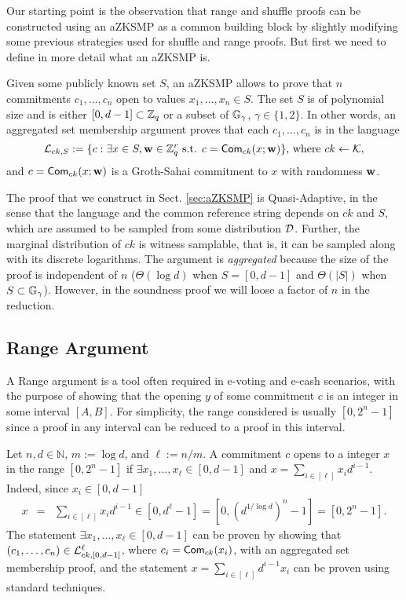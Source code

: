 Our starting point is the observation that range and shuffle proofs can be constructed using an aZKSMP as a common building block by slightly modifying some previous strategies used for shuffle and range proofs. But first we need to define in more detail what an aZKSMP is.

Given some publicly known set $S$, an aZKSMP allows to prove that $n$ commitments $c_1,\ldots,c_n$ open to values $x_1,\ldots,x_n \in S$.  The set $S$ is of polynomial size and is either $[0,d-1]\subset\mathbb{Z}_q$ or a subset of $\mathbb{G}_\gamma$, $\gamma \in \{1,2\}$.  
In other words, an aggregated set membership argument proves that each $c_1,\ldots,c_n$ is in the language
$$
\mathcal{L}_{ck,S}:=\{c: \exists x\in S, \mathbf{w}\in\mathbb{Z}_q^r \text{ s.t. } c=\mathsf{Com}_{ck}(x;\mathbf{w})\}\text{, where }ck\gets\mathcal{K},
$$
and $c=\mathsf{Com}_{ck}(x;\mathbf{w})$ is a Groth-Sahai commitment to $x$ with randomness $\mathbf{w}$.

The proof that we construct in Sect. \ref{sec:aZKSMP} is Quasi-Adaptive, in the sense that the language and the common reference string depends on $ck$ and $S$, which are assumed to be sampled from some distribution $\mathcal{D}$. Further, the marginal distribution of $ck$ is witness samplable, that is, it can be sampled along with its discrete logarithms. The argument is \textit{aggregated} because the size of the proof is independent of $n$ ($\Theta(\log d)$ when $S=[0,d-1]$ and $\Theta(|S|)$ when $S\subset\mathbb{G}_\gamma$). However, in the soundness proof we will loose a factor of $n$ in the reduction. 

\subsection{Range Argument}
A Range argument is a tool often required in e-voting and e-cash scenarios, with the purpose of showing that the opening $y$ of some commitment $c$ is an integer in some interval $[A,B]$. For simplicity, the range considered is usually $[0,2^n-1]$ since a proof in any interval can be reduced to a proof in this interval.

Let $n,d\in\mathbb{N}$, $m:=\log d$, and $\ell:=n/m$. A commitment $c$ opens to a integer $x$ in the range $[0,2^n-1]$ if $\exists x_1,\ldots,x_\ell \in[0,d-1]$ and  $x=\sum_{i\in[\ell]}x_id^{i-1}$. Indeed, since $x_i\in[0,d-1]$
\begin{eqnarray*}
x & = & \sum_{i\in[\ell]} x_i d^{i-1}
   \in  [0,d^\ell-1]  =  [0,(d^{1/\log d})^n-1] = [0,2^n-1].
\end{eqnarray*}
The statement $\exists x_1,\ldots,x_\ell \in[0,d-1]$ can be proven by showing that $(c_1,\ldots,c_n)\in\mathcal{L}_{ck,[0,d-1]}^\ell$, where $c_i=\mathsf{Com}_{ck}(x_i)$, with an aggregated set membership proof, and the statement $x=\sum_{i\in[\ell]}d^{i-1}x_i$ can be proven using standard techniques. 

